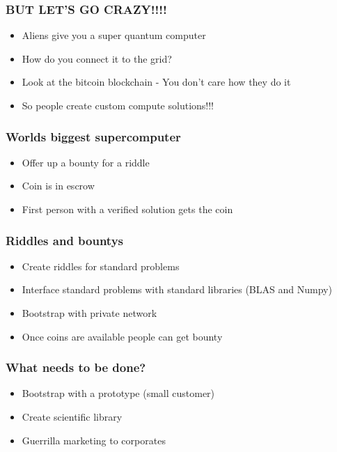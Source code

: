 \documentclass{beamer}
\begin{document}
\begin{frame}
  \frametitle{BUT LET'S GO CRAZY!!!!}
  \begin{itemize}
  \item Aliens give you a super quantum computer
  \item How do you connect it to the grid?
  \item Look at the bitcoin blockchain - You don't care how they do it
  \item So people create custom compute solutions!!!
  \end{itemize}
\end{frame}

\begin{frame}
  \frametitle{Worlds biggest supercomputer}
  \begin{itemize}
  \item Offer up a bounty for a riddle
  \item Coin is in escrow
  \item First person with a verified solution gets the coin
  \end{itemize}
\end{frame}

\begin{frame}
  \frametitle{Riddles and bountys}
  \begin{itemize}
  \item Create riddles for standard problems
  \item Interface standard problems with standard libraries (BLAS and Numpy)
  \item Bootstrap with private network
  \item Once coins are available people can get bounty
  \end{itemize}
\end{frame}

\begin{frame}
  \frametitle{What needs to be done?}
  \begin{itemize}
  \item Bootstrap with a prototype (small customer)
  \item Create scientific library
  \item Guerrilla marketing to corporates
  \end{itemize}
\end{frame}
\end{document}
